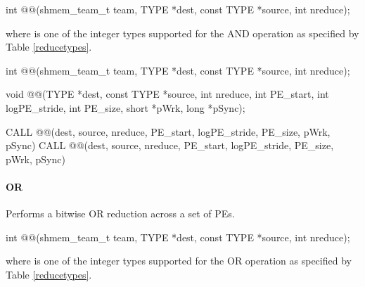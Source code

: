 \begin{apidefinition}
{\color{Green}
\begin{C11synopsis}
int @@(shmem_team_t team, TYPE *dest, const TYPE *source, int nreduce);
\end{C11synopsis}
where \TYPE{} is one of the integer types supported for the AND operation as specified by Table \ref{reducetypes}.
}

\begin{Csynopsis}
\end{Csynopsis}
{\color{Green}
\begin{CsynopsisCol}
int @@(shmem_team_t team, TYPE *dest, const TYPE *source, int nreduce);
\end{CsynopsisCol}
}
\begin{DeprecateBlock}
\begin{CsynopsisCol}
void @@(TYPE *dest, const TYPE *source, int nreduce, int PE_start, int logPE_stride, int PE_size, short *pWrk, long *pSync);
\end{CsynopsisCol}
\end{DeprecateBlock}

\begin{Fsynopsis}
CALL @@(dest, source, nreduce, PE_start, logPE_stride, PE_size, pWrk, pSync)
CALL @@(dest, source, nreduce, PE_start, logPE_stride, PE_size, pWrk, pSync)
\end{Fsynopsis}

\paragraph{OR}
Performs a bitwise OR reduction across a set of \acp{PE}.\newline

{\color{Green}
\begin{C11synopsis}
int @@(shmem_team_t team, TYPE *dest, const TYPE *source, int nreduce);
\end{C11synopsis}
where \TYPE{} is one of the integer types supported for the OR operation as specified by Table \ref{reducetypes}.
}


\end{apidefinition}

